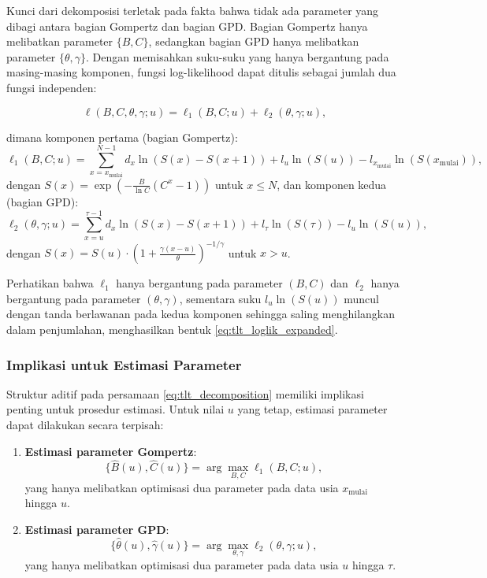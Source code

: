 Kunci dari dekomposisi terletak pada fakta bahwa tidak ada parameter yang dibagi antara bagian Gompertz dan bagian GPD. Bagian Gompertz hanya melibatkan parameter $\{B, C\}$, sedangkan bagian GPD hanya melibatkan parameter $\{\theta, \gamma\}$. Dengan memisahkan suku-suku yang hanya bergantung pada masing-masing komponen, fungsi log-likelihood dapat ditulis sebagai jumlah dua fungsi independen:

\begin{equation}
\ell(B, C, \theta, \gamma; u) = \ell_1(B, C; u) + \ell_2(\theta, \gamma; u),
\label{eq:tlt_decomposition}
\end{equation}

dimana komponen pertama (bagian Gompertz):
\begin{equation}
\ell_1(B, C; u) = \sum_{x=x_{\text{mulai}}}^{N-1} d_x \ln(S(x) - S(x+1)) + l_u \ln(S(u)) - l_{x_{\text{mulai}}} \ln(S(x_{\text{mulai}})),
\label{eq:tlt_gompertz_loglik}
\end{equation}
dengan $S(x) = \exp\left(-\frac{B}{\ln C}(C^x - 1)\right)$ untuk $x \leq N$, dan komponen kedua (bagian GPD):
\begin{equation}
\ell_2(\theta, \gamma; u) = \sum_{x=u}^{\tau-1} d_x \ln(S(x) - S(x+1)) + l_\tau \ln(S(\tau)) - l_u \ln(S(u)),
\label{eq:tlt_gpd_loglik}
\end{equation}
dengan $S(x) = S(u) \cdot \left(1 + \frac{\gamma(x-u)}{\theta}\right)^{-1/\gamma}$ untuk $x > u$.

Perhatikan bahwa $\ell_1$ hanya bergantung pada parameter $(B, C)$ dan $\ell_2$ hanya bergantung pada parameter $(\theta, \gamma)$, sementara suku $l_u \ln(S(u))$ muncul dengan tanda berlawanan pada kedua komponen sehingga saling menghilangkan dalam penjumlahan, menghasilkan bentuk \eqref{eq:tlt_loglik_expanded}.

\subsubsection{Implikasi untuk Estimasi Parameter}

Struktur aditif pada persamaan \eqref{eq:tlt_decomposition} memiliki implikasi penting untuk prosedur estimasi. Untuk nilai $u$ yang tetap, estimasi parameter dapat dilakukan secara terpisah:

\begin{enumerate}
    \item \textbf{Estimasi parameter Gompertz}: 
    \begin{equation}
    \{\hat{B}(u), \hat{C}(u)\} = \arg\max_{B,C} \ell_1(B, C; u),
    \label{eq:mle_gompertz}
    \end{equation}
    yang hanya melibatkan optimisasi dua parameter pada data usia $x_{\text{mulai}}$ hingga $u$.
    
    \item \textbf{Estimasi parameter GPD}: 
    \begin{equation}
    \{\hat{\theta}(u), \hat{\gamma}(u)\} = \arg\max_{\theta,\gamma} \ell_2(\theta, \gamma; u),
    \label{eq:mle_gpd}
    \end{equation}
    yang hanya melibatkan optimisasi dua parameter pada data usia $u$ hingga $\tau$.
\end{enumerate}

